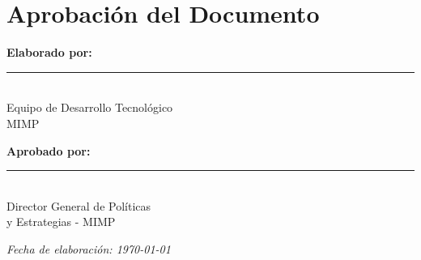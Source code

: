 \documentclass[12pt,a4paper]{article}
\begin{document}
\section*{Aprobación del Documento}

\vspace{2cm}

\noindent
\begin{minipage}{0.45\textwidth}
\textbf{Elaborado por:}\\[0.5cm]
\rule{5cm}{0.4pt}\\
Equipo de Desarrollo Tecnológico\\
MIMP
\end{minipage}
\hfill
\begin{minipage}{0.45\textwidth}
\textbf{Aprobado por:}\\[0.5cm]
\rule{5cm}{0.4pt}\\
Director General de Políticas\\
y Estrategias - MIMP
\end{minipage}

\vspace{1cm}
\noindent
\textit{Fecha de elaboración: \today}
\end{document}
